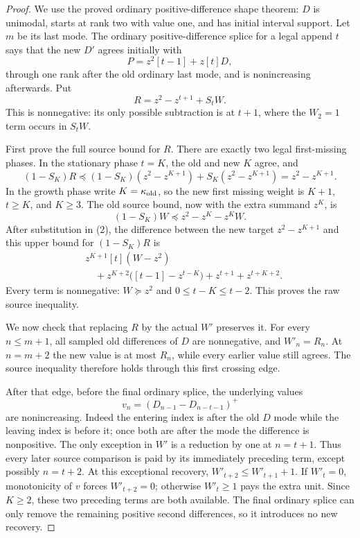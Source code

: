 \begin{proof}
We use the proved ordinary positive-difference shape theorem:
$D$ is unimodal, starts at rank two with value one, and has
initial interval support. Let $m$ be its last mode. The ordinary
positive-difference splice for a legal append $t$ says that the
new $D'$ agrees initially with
\[
                   P=z^2[t-1]+z[t]D,
\]
through one rank after the old ordinary last mode, and is
nonincreasing afterwards. Put
\[
                   R=z^2-z^{t+1}+S_tW.                \tag{2}
\]
This is nonnegative: its only possible subtraction is at $t+1$,
where the $W_2=1$ term occurs in $S_tW$.

First prove the full source bound for $R$. There are exactly two
legal first-missing phases. In the stationary phase $t=K$,
the old and new $K$ agree, and
\[
 (1-S_K)R\preceq(1-S_K)(z^2-z^{K+1})
                         +S_K(z^2-z^{K+1})
                    =z^2-z^{K+1}.                    \tag{3}
\]
In the growth phase write $K=\kappa_{\rm old}$, so the new
first missing weight is $K+1$, $t\ge K$, and $K\ge3$.
The old source bound, now with the extra summand $z^K$, is
\[
              (1-S_K)W\preceq z^2-z^K-z^KW.
\]
After substitution in (2), the difference between the new target
$z^2-z^{K+1}$ and this upper bound for $(1-S_K)R$ is
\[
 \begin{split}
 &z^{K+1}[t](W-z^2)\\
 &\quad+z^{K+2}\bigl([t-1]-z^{t-K}\bigr)
                 +z^{t+1}+z^{t+K+2}.                 \tag{4}
 \end{split}
\]
Every term is nonnegative: $W\succeq z^2$ and
$0\le t-K\le t-2$. This proves the raw source inequality.

We now check that replacing $R$ by the actual $W'$ preserves it.
For every $n\le m+1$, all sampled old differences of $D$ are
nonnegative, and $W'_n=R_n$. At $n=m+2$ the new value is at
most $R_n$, while every earlier value still agrees. The source
inequality therefore holds through this first crossing edge.

After that edge, before the final ordinary splice, the underlying
values
\[
        v_n=(D_{n-1}-D_{n-t-1})^+
\]
are nonincreasing. Indeed the entering index is after the old
$D$ mode while the leaving index is before it; once both are
after the mode the difference is nonpositive. The only exception
in $W'$ is a reduction by one at $n=t+1$. Thus every later source
comparison is paid by its immediately preceding term, except
possibly $n=t+2$. At this exceptional recovery,
$W'_{t+2}\le W'_{t+1}+1$. If $W'_t=0$, monotonicity of $v$
forces $W'_{t+2}=0$; otherwise $W'_t\ge1$ pays the extra unit.
Since $K\ge2$, these two preceding terms are both available.
The final ordinary splice can only remove the remaining positive
second differences, so it introduces no new recovery.


\end{proof}
